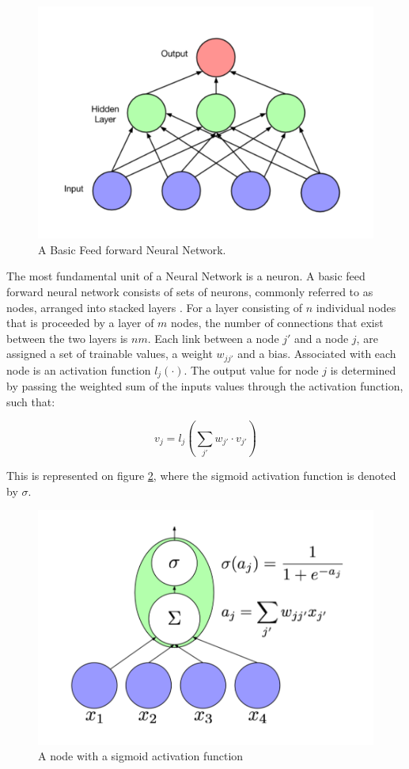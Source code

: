 \documentclass[%
 aip,
 jmp,%
 amsmath,amssymb,
 reprint,%
]{revtex4-1}
\begin{document}
\begin{figure}
\centering
\includegraphics[width=1\linewidth]{basic_net.png}
\caption{A Basic Feed forward Neural Network.}
\label{fig:ANN}
\end{figure}

The most fundamental unit of a Neural Network is a neuron. A basic feed forward neural network consists of sets of neurons, commonly referred to as nodes, arranged into stacked layers \cite{ANN}. For a layer consisting of \(n\) individual nodes that is proceeded by a layer of \(m\) nodes, the number of connections that exist between the two layers is \(nm\). Each link between a node \(j'\) and a node \(j\), are assigned a set of trainable values, a weight \(w_{jj'}\) and a bias. Associated with each node is an activation function \(l_j(\cdot)\). The output value for node \(j\) is determined by passing the weighted sum of the inputs values through the activation function, such that:


\begin{equation}
v_j=l_j(\sum_{j'}w_{j'} \cdot v_{j'})
\end{equation}


This is represented on figure \ref{fig:node}, where the sigmoid activation function is denoted by \(\sigma\). 


\begin{figure}
\centering
\includegraphics[width=0.8\linewidth]{node.png}
\caption{A node with a sigmoid activation function}
\label{fig:node}
\end{figure}
\end{document}
